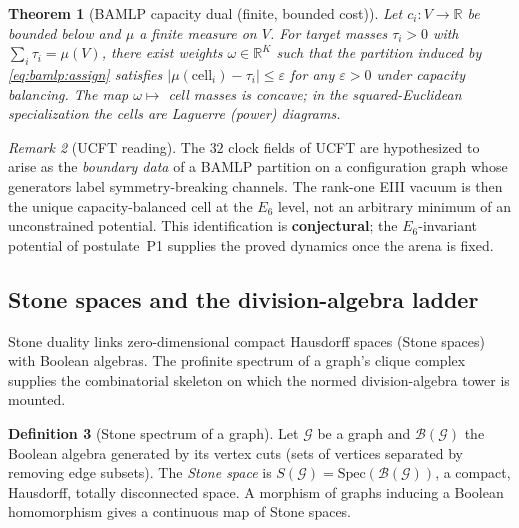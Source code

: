\documentclass[11pt]{article}
\theoremstyle{plain}
\newtheorem{theorem}{Theorem}[section]
\theoremstyle{definition}
\newtheorem{definition}[theorem]{Definition}
\theoremstyle{remark}
\newtheorem{remark}[theorem]{Remark}
\begin{document}
\begin{theorem}[BAMLP capacity dual (finite, bounded cost)]\label{thm:bamlp:dual}
Let $c_i:V\to\mathbb{R}$ be bounded below and $\mu$ a finite measure on $V$.
For target masses $\tau_i>0$ with $\sum_i\tau_i=\mu(V)$, there exist weights
$\omega\in\mathbb{R}^K$ such that the partition induced by
\eqref{eq:bamlp:assign} satisfies $|\mu(\mathrm{cell}_i)-\tau_i|\le\varepsilon$
for any $\varepsilon>0$ under capacity balancing. The map $\omega\mapsto$ cell
masses is concave; in the squared-Euclidean specialization the cells are
Laguerre (power) diagrams.
\end{theorem}

\begin{remark}[UCFT reading]\label{rem:bamlp:ucft}
The $32$ clock fields of UCFT are hypothesized to arise as the \emph{boundary
data} of a BAMLP partition on a configuration graph whose generators label
symmetry-breaking channels. The rank-one EIII vacuum is then the unique
capacity-balanced cell at the $E_6$ level, not an arbitrary minimum of an
unconstrained potential. This identification is \textbf{conjectural}; the
$E_6$-invariant potential of postulate~\textnormal{P1} supplies the proved
dynamics once the arena is fixed.
\end{remark}

\subsection{Stone spaces and the division-algebra ladder}
\label{sec:bamlp:stone}

Stone duality links zero-dimensional compact Hausdorff spaces (Stone spaces)
with Boolean algebras. The profinite spectrum of a graph's clique complex
supplies the combinatorial skeleton on which the normed division-algebra tower
is mounted.

\begin{definition}[Stone spectrum of a graph]\label{def:bamlp:stone}
Let $\mathcal{G}$ be a graph and $\mathcal{B}(\mathcal{G})$ the Boolean algebra
generated by its vertex cuts (sets of vertices separated by removing edge
subsets). The \emph{Stone space} is $S(\mathcal{G})=\mathrm{Spec}(\mathcal{B}
(\mathcal{G}))$, a compact, Hausdorff, totally disconnected space. A morphism of
graphs inducing a Boolean homomorphism gives a continuous map of Stone spaces.
\end{definition}
\end{document}
